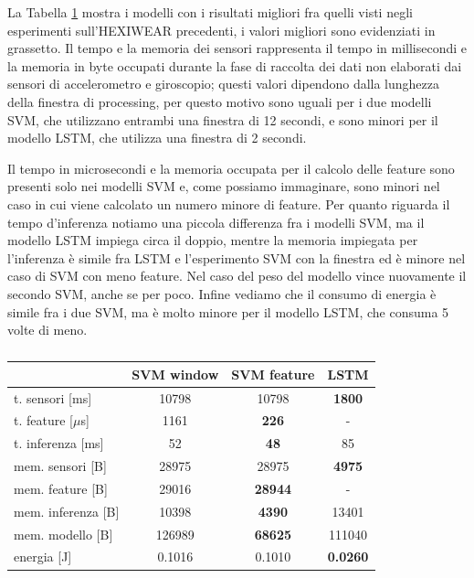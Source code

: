 La Tabella \ref{tab:memory-hexi} mostra i modelli con i risultati migliori fra quelli visti negli esperimenti sull'HEXIWEAR precedenti, i valori migliori sono evidenziati in grassetto. Il tempo e la memoria dei sensori rappresenta il tempo in millisecondi e la memoria in byte occupati durante la fase di raccolta dei dati non elaborati dai sensori di accelerometro e giroscopio; questi valori dipendono dalla lunghezza della finestra di processing, per questo motivo sono uguali per i due modelli SVM, che utilizzano entrambi una finestra di 12 secondi, e sono minori per il modello LSTM, che utilizza una finestra di 2 secondi.

Il tempo in microsecondi e la memoria occupata per il calcolo delle feature sono presenti solo nei modelli SVM e, come possiamo immaginare, sono minori nel caso in cui viene calcolato un numero minore di feature. Per quanto riguarda il tempo d'inferenza notiamo una piccola differenza fra i modelli SVM, ma il modello LSTM impiega circa il doppio, mentre la memoria impiegata per l'inferenza è simile fra LSTM e l'esperimento SVM con la finestra ed è minore nel caso di SVM con meno feature. Nel caso del peso del modello vince nuovamente il secondo SVM, anche se per poco. Infine vediamo che il consumo di energia è simile fra i due SVM, ma è molto minore per il modello LSTM, che consuma 5 volte di meno.


\begin{table}
    \centering
    \begin{tabular}{l c c c}
        \hline
        & SVM window & SVM feature & LSTM \\
        \hline
        t. sensori [ms] & 10798 & 10798 & \textbf{1800} \\
        t. feature [$\mu$s] & 1161 & \textbf{226} & - \\
        t. inferenza [ms] & 52 & \textbf{48} & 85 \\
        \hline
        mem. sensori [B] & 28975 & 28975 & \textbf{4975} \\
        mem. feature [B] & 29016 & \textbf{28944} & - \\
        mem. inferenza [B] & 10398 & \textbf{4390} & 13401 \\
        mem. modello [B] & 126989 & \textbf{68625} & 111040 \\
        \hline
        energia [J] & 0.1016 & 0.1010 & \textbf{0.0260} \\
        \hline
    \end{tabular}
    \caption{}
    \label{tab:memory-hexi}
\end{table}

